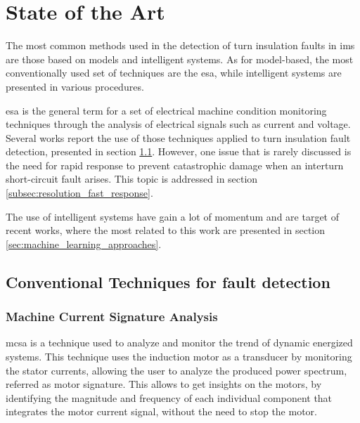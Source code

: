 \chapter{State of the Art}
\label{cha:state_of_the_art}

The most common methods used in the detection of turn insulation faults in \acrshort{ims} are those based on models and intelligent systems. As for model-based, the most conventionally used set of techniques are the \acrfull{esa}, while intelligent systems are presented in various 
procedures.

\acrshort{esa} is the general term for a set of electrical machine condition monitoring techniques through the analysis of electrical signals such as current and voltage. Several works report the use of those techniques applied to turn insulation fault detection, presented in section \ref{sec:conventional_techniques}. However, one issue that is rarely discussed is the need for rapid response to prevent catastrophic damage when an interturn short-circuit fault arises. This topic is addressed in section \ref{subsec:resolution_fast_response}.

The use of intelligent systems have gain a lot of momentum and are target of recent works, where the most related to this work are presented in section \ref{sec:machine_learning_approaches}.



\section{Conventional Techniques for fault detection} %
\label{sec:conventional_techniques}

\subsection{Machine Current Signature Analysis} %
\label{subsec:mcsa}
\acrfull{mcsa} is a technique used to analyze and monitor the trend of dynamic energized systems. This technique uses the induction motor as a transducer by monitoring the stator currents, allowing the user to analyze the produced power spectrum, referred as motor signature. This allows to get insights on the motors, by identifying the magnitude and frequency of each individual component that integrates the motor current signal, without the need to stop the motor.


